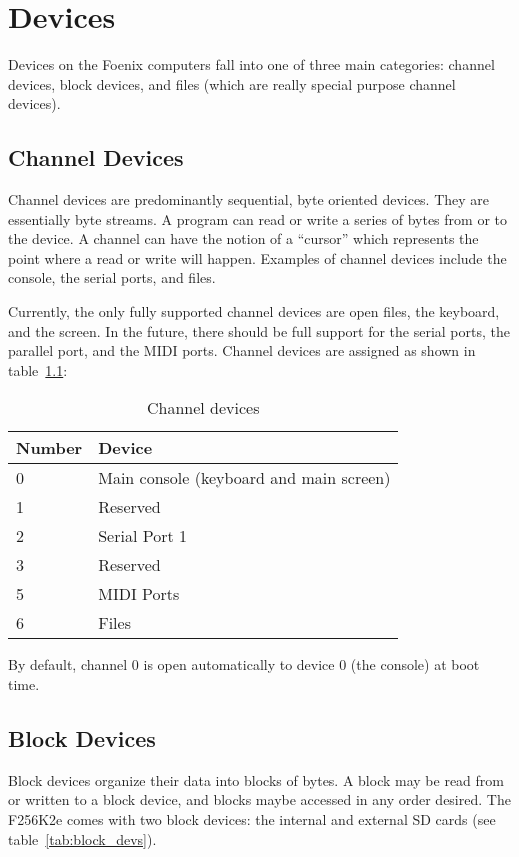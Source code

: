 \chapter{Devices}
Devices on the Foenix computers fall into one of three main categories: channel devices, block devices, and files (which are really special purpose channel devices).

\section*{Channel Devices}
Channel devices are predominantly sequential, byte oriented devices. They are essentially byte streams. A program can read or write a series of bytes from or to the device. A channel can have the notion of a ``cursor'' which represents the point where a read or write will happen. Examples of channel devices include the console, the serial ports, and files.

Currently, the only fully supported channel devices are open files, the keyboard, and the screen. In the future, there should be full support for the serial ports, the parallel port, and the MIDI ports. Channel devices are assigned as shown in table~\ref{tab:chan_devs}:

\begin{table}
    \begin{center}
        \begin{tabular}{|l||l|} \hline
            Number & Device \\ \hline\hline
            0 & Main console (keyboard and main screen) \\ \hline
            1 & Reserved \\ \hline
            2 & Serial Port 1 \\ \hline
            3 & Reserved \\ \hline
            5 & MIDI Ports \\ \hline
            6 & Files \\ \hline
        \end{tabular}
    \end{center}
    \caption{Channel devices}
    \label{tab:chan_devs}
\end{table}

By default, channel 0 is open automatically to device 0 (the console) at boot time.

\section*{Block Devices}
Block devices organize their data into blocks of bytes. A block may be read from or written to a block device, and blocks maybe accessed in any order desired. The F256K2e comes with two block devices: the internal and external SD cards (see table~\ref{tab:block_devs}).

